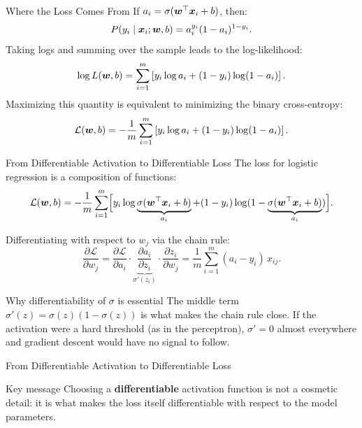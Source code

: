 \documentclass[11pt,aspectratio=169,professionalfonts]{beamer}
\begin{document}
%
%
\begin{frame}{Where the Loss Comes From}
If $a_i = \sigma(\bm{w}^{\top}\bm{x}_i+b)$, then:
\[
P(y_i\mid \bm{x}_i;\bm{w},b)=a_i^{y_i}(1-a_i)^{1-y_i}.
\]
Taking logs and summing over the sample leads to the log-likelihood:
\[
\log L(\bm{w},b)=\sum_{i=1}^{m}\left[y_i\log a_i + (1-y_i)\log(1-a_i)\right].
\]
Maximizing this quantity is equivalent to minimizing the binary cross-entropy:
\[
\mathcal{L}(\bm{w},b)= -\frac{1}{m}\sum_{i=1}^{m}\left[y_i\log a_i + (1-y_i)\log(1-a_i)\right].
\]
\end{frame}
%
%
\begin{frame}{From Differentiable Activation to Differentiable Loss}
The loss for logistic regression is a composition of functions:
\[
\mathcal{L}(\bm{w},b)
= -\frac{1}{m}\sum_{i=1}^{m}\Bigl[y_i\log\underbrace{\sigma(\bm{w}^{\top}\bm{x}_i+b)}_{a_i}
  + (1-y_i)\log(1-\underbrace{\sigma(\bm{w}^{\top}\bm{x}_i+b)}_{a_i})\Bigr].
\]

\vspace{0.1cm}
Differentiating with respect to $w_j$ via the chain rule:
\[
\frac{\partial \mathcal{L}}{\partial w_j}
= \frac{\partial \mathcal{L}}{\partial a_i}\cdot
  \underbrace{\frac{\partial a_i}{\partial z_i}}_{\sigma'(z_i)}\cdot
  \frac{\partial z_i}{\partial w_j}
= \frac{1}{m}\sum_{i=1}^{m}(a_i - y_i)\,x_{ij}.
\]

\vspace{0.05cm}
\begin{block}{Why differentiability of $\sigma$ is essential}
The middle term $\sigma'(z) = \sigma(z)(1-\sigma(z))$ is what makes the chain rule close.
If the activation were a hard threshold (as in the perceptron), $\sigma' = 0$ almost everywhere and gradient descent would have no signal to follow.
\end{block}
\end{frame}
%
%
\begin{frame}{From Differentiable Activation to Differentiable Loss}
\begin{alertblock}{Key message}
Choosing a \textbf{differentiable} activation function is not a cosmetic detail: it is what makes the loss itself differentiable with respect to the model parameters.
\end{alertblock}
\end{frame}
%
\end{document}
